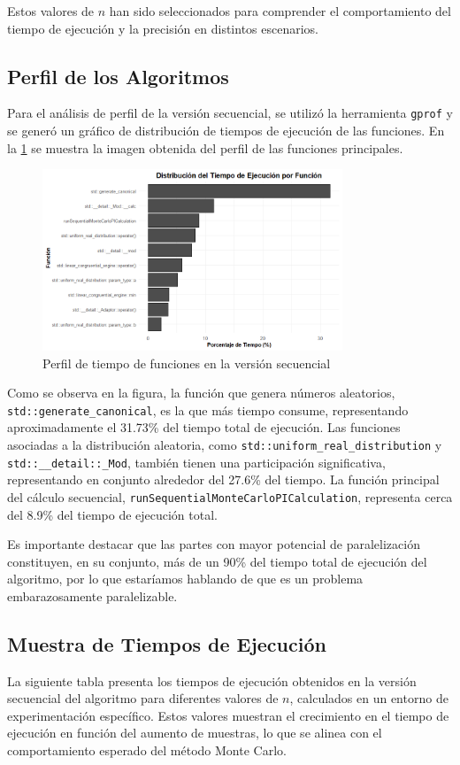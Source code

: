 \documentclass[a4paper, 10pt, onecolumn]{IEEEtran}
\begin{document}
Estos valores de $n$ han sido seleccionados para comprender el comportamiento del tiempo de ejecución y la precisión en distintos escenarios.

\subsection{Perfil de los Algoritmos}
Para el análisis de perfil de la versión secuencial, se utilizó la herramienta \texttt{gprof} y se generó un gráfico de distribución de tiempos de ejecución de las funciones. En la \cref{fig:sec_profile} se muestra la imagen obtenida del perfil de las funciones principales.

\begin{figure}[H]
  \centering
  \includegraphics[width=0.8\textwidth]{./img/secuencial_profiling.png}
  \caption{Perfil de tiempo de funciones en la versión secuencial}
  \label{fig:sec_profile}
\end{figure}

Como se observa en la figura, la función que genera números aleatorios, \texttt{std::generate\_canonical}, es la que más tiempo consume, representando aproximadamente el 31.73\% del tiempo total de ejecución. Las funciones asociadas a la distribución aleatoria, como \texttt{std::uniform\_real\_distribution} y \texttt{std::\_\_detail::\_Mod}, también tienen una participación significativa, representando en conjunto alrededor del 27.6\% del tiempo. La función principal del cálculo secuencial, \texttt{runSequentialMonteCarloPICalculation}, representa cerca del 8.9\% del tiempo de ejecución total.

Es importante destacar que las partes con mayor potencial de paralelización constituyen, en su conjunto, más de un 90\% del tiempo total de ejecución del algoritmo, por lo que estaríamos hablando de que es un problema embarazosamente paralelizable.

\subsection{Muestra de Tiempos de Ejecución}
La siguiente tabla presenta los tiempos de ejecución obtenidos en la versión secuencial del algoritmo para diferentes valores de $n$, calculados en un entorno de experimentación específico. Estos valores muestran el crecimiento en el tiempo de ejecución en función del aumento de muestras, lo que se alinea con el comportamiento esperado del método Monte Carlo.
\end{document}
